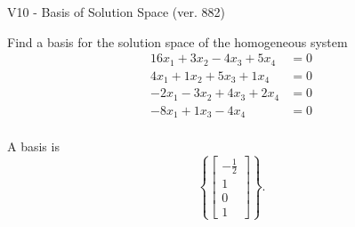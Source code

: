 \begin{exercise}
  \begin{exerciseTitle}V10 - Basis of Solution Space (ver. 882)\end{exerciseTitle}
  \begin{exerciseStatement}
    Find a basis for the solution space of the homogeneous system 
\begin{align*}
 16 x_ 1 + 3 x_ 2 -4 x_ 3 + 5 x_ 4 &= 0  \\ 
  4 x_ 1 + 1 x_ 2 + 5 x_ 3 + 1 x_ 4 &= 0  \\ 
  -2 x_ 1 -3 x_ 2 + 4 x_ 3 + 2 x_ 4 &= 0  \\ 
  -8 x_ 1 + 1 x_ 3 -4 x_ 4 &= 0  \\ 
 \end{align*}


 
  \end{exerciseStatement}

  \begin{exerciseAnswer}
   A basis is   
\[\left\{\left[\begin{array}{c}
-\frac{1}{2} \\
1 \\
0 \\
1
\end{array}\right]\right\}.\]

  


  \end{exerciseAnswer}
\end{exercise}